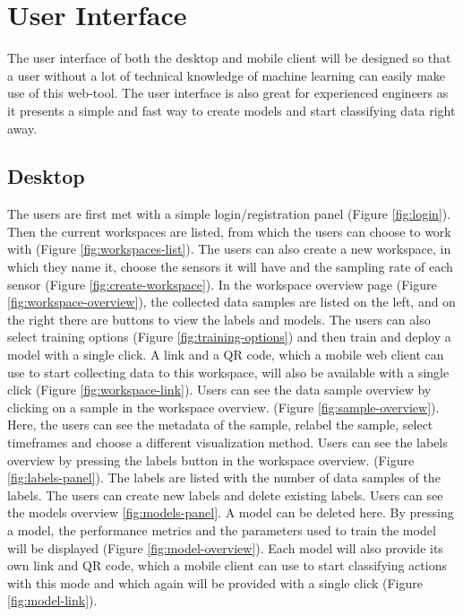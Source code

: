 \section{User Interface}
The user interface of both the desktop and mobile client will be designed so that a user without a lot of technical knowledge of machine learning can easily make use of this web-tool. The user interface is also great for experienced engineers as it presents a simple and fast way to create models and start classifying data right away.

\subsection{Desktop}
The users are first met with a simple login/registration panel (Figure \ref{fig:login}). Then the current workspaces are listed, from which the users can choose to work with (Figure \ref{fig:workspaces-list}). The users can also create a new workspace, in which they name it, choose the sensors it will have and the sampling rate of each sensor (Figure \ref{fig:create-workspace}). In the workspace overview page  (Figure \ref{fig:workspace-overview}), the collected data samples are listed on the left, and on the right there are buttons to view the labels and models. The users can also select training options (Figure \ref{fig:training-options}) and then train and deploy a model with a single click. A link and a QR code, which a mobile web client can use to start collecting data to this workspace, will also be available with a single click (Figure \ref{fig:workspace-link}). Users can see the data sample overview by clicking on a sample in the workspace overview. (Figure \ref{fig:sample-overview}). Here, the users can see the metadata of the sample, relabel the sample, select timeframes and choose a different visualization method. Users can see the labels overview by pressing the labels button in the workspace overview. (Figure \ref{fig:labels-panel}). The labels are listed with the number of data samples of the labels. The users can create new labels and delete existing labels. Users can see the models overview \ref{fig:models-panel}. A model can be deleted here. By pressing a model, the performance metrics and the parameters used to train the model will be displayed (Figure \ref{fig:model-overview}). Each model will also provide its own link and QR code, which a mobile client can use to start classifying actions with this mode and which again will be provided with a single click (Figure \ref{fig:model-link}).

